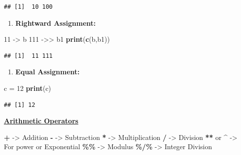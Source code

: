 \documentclass[
]{article}
\newenvironment{Shaded}{\begin{snugshade}}{\end{snugshade}}
\newcommand{\DecValTok}[1]{\textcolor[rgb]{0.00,0.00,0.81}{#1}}
\newcommand{\FunctionTok}[1]{\textcolor[rgb]{0.13,0.29,0.53}{\textbf{#1}}}
\newcommand{\NormalTok}[1]{#1}
\newcommand{\OtherTok}[1]{\textcolor[rgb]{0.56,0.35,0.01}{#1}}
\newcommand{\SpecialCharTok}[1]{\textcolor[rgb]{0.81,0.36,0.00}{\textbf{#1}}}
\providecommand{\tightlist}{%
  \setlength{\itemsep}{0pt}\setlength{\parskip}{0pt}}
\begin{document}
\begin{verbatim}
## [1]  10 100
\end{verbatim}

\begin{enumerate}
\def\labelenumi{\arabic{enumi}.}
\setcounter{enumi}{1}
\tightlist
\item
  \textbf{Rightward Assignment:}
\end{enumerate}

\begin{Shaded}
\begin{Highlighting}[]
\DecValTok{11} \OtherTok{{-}\textgreater{}}\NormalTok{ b}
\DecValTok{111} \OtherTok{{-}\textgreater{}\textgreater{}}\NormalTok{ b1}
\FunctionTok{print}\NormalTok{(}\FunctionTok{c}\NormalTok{(b,b1))}
\end{Highlighting}
\end{Shaded}

\begin{verbatim}
## [1]  11 111
\end{verbatim}

\begin{enumerate}
\def\labelenumi{\arabic{enumi}.}
\setcounter{enumi}{2}
\tightlist
\item
  \textbf{Equal Assignment:}
\end{enumerate}

\begin{Shaded}
\begin{Highlighting}[]
\NormalTok{c }\OtherTok{=} \DecValTok{12}
\FunctionTok{print}\NormalTok{(c)}
\end{Highlighting}
\end{Shaded}

\begin{verbatim}
## [1] 12
\end{verbatim}

\ul{\textbf{Arithmetic Operators}}

\begin{Shaded}
\begin{Highlighting}[]
\SpecialCharTok{+} \OtherTok{{-}\textgreater{}}\NormalTok{ Addition}
\SpecialCharTok{{-}} \OtherTok{{-}\textgreater{}}\NormalTok{ Subtraction }
\SpecialCharTok{*} \OtherTok{{-}\textgreater{}}\NormalTok{ Multiplication}
\SpecialCharTok{/} \OtherTok{{-}\textgreater{}}\NormalTok{ Division}
\SpecialCharTok{**}\NormalTok{ or }\SpecialCharTok{\^{}} \OtherTok{{-}\textgreater{}}\NormalTok{ For power or Exponential}
\SpecialCharTok{\%\%} \OtherTok{{-}\textgreater{}}\NormalTok{ Modulus}
\SpecialCharTok{\%/\%} \OtherTok{{-}\textgreater{}}\NormalTok{ Integer Division}
\end{Highlighting}
\end{Shaded}
\end{document}
